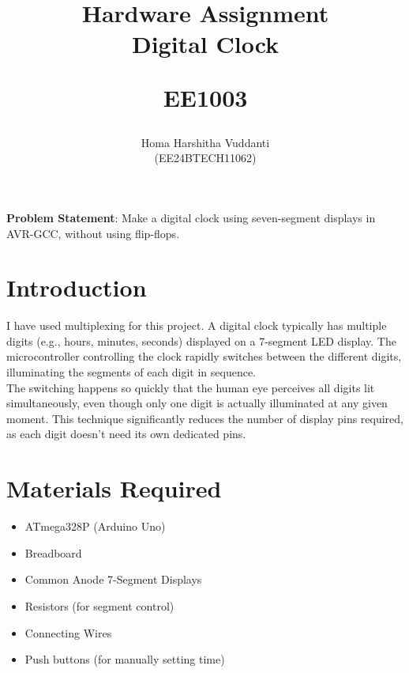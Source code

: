 \documentclass[journal]{IEEEtran}
\begin{document}
\title{
Hardware Assignment \\ Digital Clock

\large{EE1003}
}

\author{Homa Harshitha Vuddanti \\(EE24BTECH11062)}

\maketitle

\bigskip

\textbf{Problem Statement}: Make a digital clock using seven-segment displays in AVR-GCC, without using flip-flops.
\section{Introduction}
I have used multiplexing for this project. A digital clock typically has multiple digits (e.g., hours, minutes, seconds) displayed on a 7-segment LED display. The microcontroller controlling the clock rapidly switches between the different digits, illuminating the segments of each digit in sequence.\\ The switching happens so quickly that the human eye perceives all digits lit simultaneously, even though only one digit is actually illuminated at any given moment. This technique significantly reduces the number of display pins required, as each digit doesn't need its own dedicated pins.
\section{Materials Required}
\begin{itemize}
    \item ATmega328P (Arduino Uno)
    \item Breadboard
    \item Common Anode 7-Segment Displays
    \item Resistors (for segment control)
    \item Connecting Wires
    \item Push buttons (for manually setting time)
\end{itemize}
\end{document}

